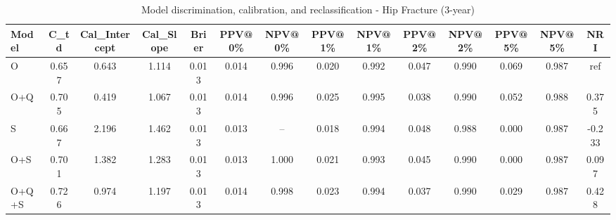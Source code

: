 \begin{table}[htbp]
\centering
\small
\caption{Model discrimination, calibration, and reclassification - Hip Fracture (3-year)}
\label{tab:perf_pd_3y}
\begin{tabular}{lccccccccccccc}
\toprule
Model & C\_td & Cal\_Intercept & Cal\_Slope & Brier & PPV@0\% & NPV@0\% & PPV@1\% & NPV@1\% & PPV@2\% & NPV@2\% & PPV@5\% & NPV@5\% & NRI \\
\midrule
O & 0.657 & 0.643 & 1.114 & 0.013 & 0.014 & 0.996 & 0.020 & 0.992 & 0.047 & 0.990 & 0.069 & 0.987 & ref \\
O+Q & 0.705 & 0.419 & 1.067 & 0.013 & 0.014 & 0.996 & 0.025 & 0.995 & 0.038 & 0.990 & 0.052 & 0.988 & 0.375 \\
S & 0.667 & 2.196 & 1.462 & 0.013 & 0.013 & -- & 0.018 & 0.994 & 0.048 & 0.988 & 0.000 & 0.987 & -0.233 \\
O+S & 0.701 & 1.382 & 1.283 & 0.013 & 0.013 & 1.000 & 0.021 & 0.993 & 0.045 & 0.990 & 0.000 & 0.987 & 0.097 \\
O+Q+S & 0.726 & 0.974 & 1.197 & 0.013 & 0.014 & 0.998 & 0.023 & 0.994 & 0.037 & 0.990 & 0.029 & 0.987 & 0.428 \\
\bottomrule
\end{tabular}
\end{table}